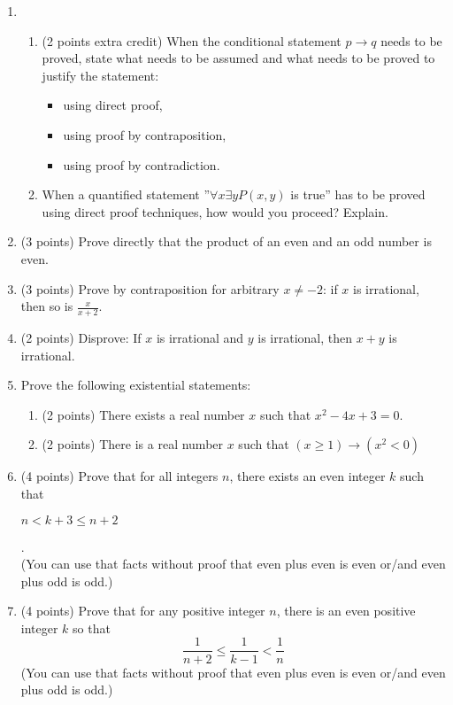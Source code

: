 \documentclass{article}
\begin{document}
\begin{enumerate}
    \item 
    \begin{enumerate}
        \item (2 points extra credit) When the conditional statement $p \rightarrow q$ needs to be proved, state what needs to be assumed and what needs to be proved to justify the statement:
        
        \begin{itemize}
            \item using direct proof,
            \item using proof by contraposition,
            \item using proof by contradiction.
        \end{itemize}
        
        \item When a quantified statement ”$\forall x\exists yP (x, y)$ is true” has to be proved using direct proof techniques, how would you proceed? Explain.
    \end{enumerate}


    \item (3 points) Prove directly that the product of an even and an odd number is even.
    \item (3 points) Prove by contraposition for arbitrary $x \neq -2$: if $x$ is irrational, then so is $\frac{x}{x+2}$.
    \item (2 points) Disprove: If $x$ is irrational and $y$ is irrational, then $x + y$ is irrational.
    \item Prove the following existential statements:
    \begin{enumerate}
        \item (2 points) There exists a real number $x$ such that $x^2 - 4x + 3 = 0$.
        \item (2 points) There is a real number $x$ such that $(x \geq 1) \rightarrow (x^2 < 0)$
    \end{enumerate}
    \newpage
    \item (4 points) Prove that for all integers $n$, there exists an even integer $k$ such that
    \begin{center}
       $n < k + 3 \leq n + 2$
    \end{center}
    .\\
    (You can use that facts without proof that even plus even is even or/and even plus odd is odd.)
    \item (4 points) Prove that for any positive integer $n$, there is an even positive integer $k$ so that \[\frac{1}{n + 2} \leq \frac{1}{k - 1} < \frac{1}{n}\]
    (You can use that facts without proof that even plus even is even or/and even plus odd is odd.)


\end{enumerate}
\end{document}

